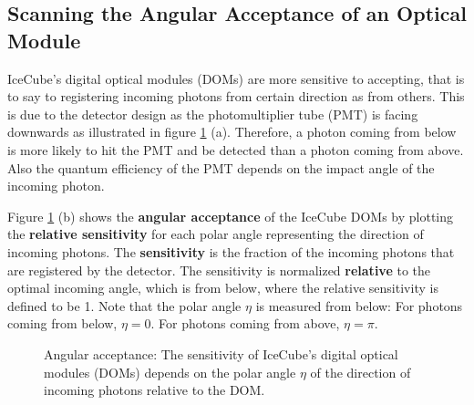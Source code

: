 
\subsection{Scanning the Angular Acceptance of an Optical Module}
\label{sec:angular_acceptance_scan}

IceCube's digital optical modules (DOMs) are more sensitive to accepting, that is to say to registering incoming photons from certain direction as from others. This is due to the detector design as the photomultiplier tube (PMT) is facing downwards as illustrated in figure \ref{fig:weihee6X} (a). Therefore, a photon coming from below is more likely to hit the PMT and be detected than a photon coming from above. Also the quantum efficiency of the PMT depends on the impact angle of the incoming photon.

Figure \ref{fig:weihee6X} (b) shows the \textbf{angular acceptance} of the IceCube DOMs by plotting the \textbf{relative sensitivity} for each polar angle representing the direction of incoming photons. The \textbf{sensitivity} is the fraction of the incoming photons that are registered by the detector. The sensitivity is normalized \textbf{relative} to the optimal incoming angle, which is from below, where the relative sensitivity is defined to be 1. Note that the polar angle $\eta$ is measured from below: For photons coming from below, $\eta = 0$. For photons coming from above, $\eta = \pi$.


\begin{figure}[htbp]
  \hfill
  \caption{Angular acceptance: The sensitivity of IceCube's digital optical modules (DOMs) depends on the polar angle $\eta$ of the direction of incoming photons relative to the DOM.}
  \label{fig:weihee6X}
\end{figure}

